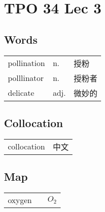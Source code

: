 \section{TPO 34 Lec 3}

\subsection{Words}

\begin{tabular}{lll}
    pollination & n.   & 授粉  \\
    polllinator & n.   & 授粉者 \\
    delicate    & adj. & 微妙的 \\
\end{tabular}

\subsection{Collocation}

\begin{tabular}{ll}
    collocation & 中文 \\
\end{tabular}

\subsection{Map}

\begin{tabular}{rc@{\quad$\to$\quad}l}
    oxygen &  & $O_{2}$ \\
\end{tabular}
